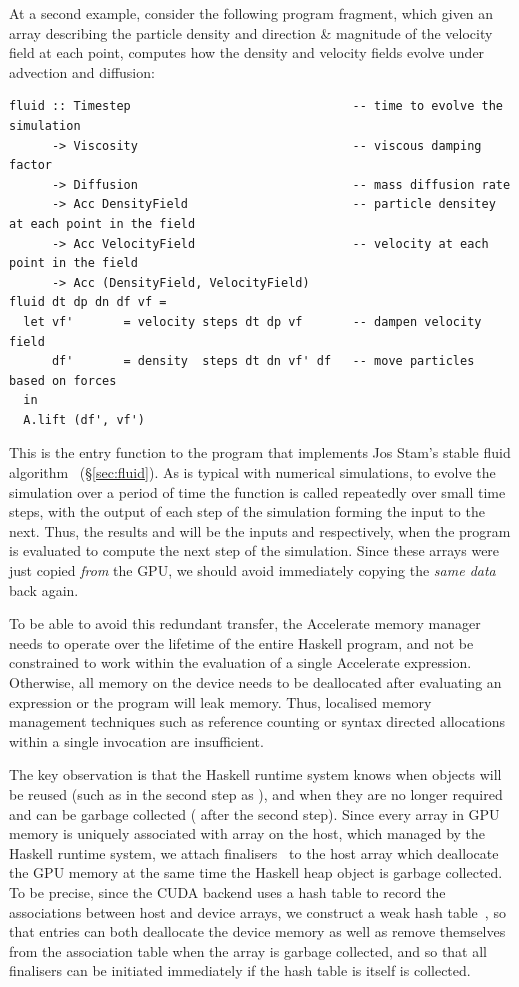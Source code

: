 At a second example, consider the following program fragment, which given an
array describing the particle density  and direction \& magnitude of
the velocity field  at each point, computes how the density and
velocity fields evolve under advection and diffusion:
%
\begin{lstlisting}[style=haskell]
fluid :: Timestep                               -- time to evolve the simulation
      -> Viscosity                              -- viscous damping factor
      -> Diffusion                              -- mass diffusion rate
      -> Acc DensityField                       -- particle densitey at each point in the field
      -> Acc VelocityField                      -- velocity at each point in the field
      -> Acc (DensityField, VelocityField)
fluid dt dp dn df vf =
  let vf'       = velocity steps dt dp vf       -- dampen velocity field
      df'       = density  steps dt dn vf' df   -- move particles based on forces
  in
  A.lift (df', vf')
\end{lstlisting}
%
This is the entry function to the program that implements Jos Stam's stable
fluid algorithm~\cite{Stam:1999ey} (\S\ref{sec:fluid}). As is typical with
numerical simulations, to evolve the simulation over a period of time the
function is called repeatedly over small time steps, with the output of each
step of the simulation forming the input to the next. Thus, the results
 and  will be the inputs  and 
respectively, when the program is evaluated to compute the next step of the
simulation. Since these arrays were just copied \emph{from} the GPU, we should
avoid immediately copying the \emph{same data} back again.

To be able to avoid this redundant transfer, the Accelerate memory manager needs
to operate over the lifetime of the entire Haskell program, and not be
constrained to work within the evaluation of a single Accelerate expression.
Otherwise, all memory on the device needs to be deallocated after evaluating an
expression or the program will leak memory. Thus, localised memory management
techniques such as reference counting or syntax directed allocations within a
single  invocation are insufficient.

The key observation is that the Haskell runtime system knows when objects will
be reused (such as  in the second step as ), and when they
are no longer required and can be garbage collected ( after the second
step). Since every array in GPU memory is uniquely associated with array on the
host, which managed by the Haskell runtime system, we attach
finalisers~\cite{PeytonJones:2000ks} to the host array which deallocate the GPU
memory at the same time the Haskell heap object is garbage collected. To be
precise, since the CUDA backend uses a hash table to record the associations
between host and device arrays, we construct a weak hash
table~\cite{PeytonJones:2000ks}, so that entries can both deallocate the device
memory as well as remove themselves from the association table when the array is
garbage collected, and so that all finalisers can be initiated immediately if
the hash table is itself is collected.

